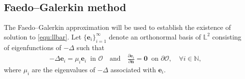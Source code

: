 \documentclass[11pt, reqno]{amsart}
\theoremstyle{definition}
\newtheorem{lemma}[theorem]{Lemma}
\numberwithin{equation}{section}
\newcommand{\bff}{\boldsymbol}
\newcommand{\bb}{\mathbb}
\newcommand{\norm}[2]{\left\|{#1}\right\|_{#2}}
\begin{document}
%


\subsection{Faedo--Galerkin method}\label{subsec:faedo}

The Faedo--Galerkin approximation will be used to establish the existence of solution to \eqref{equ:llbar}.
Let $\{\bff{e}_i\}_{i=1}^\infty$ denote an orthonormal basis of $\bb{L}^2$
consisting of eigenfunctions of $-\Delta$ such that
\begin{align*}
	-\Delta \bff{e}_i =\mu_i \bff{e}_i \ \text{ in $\mathscr{O}$}
	\quad\text{and}\quad
	\frac{\partial \bff{e}_i}{\partial \bff{n}}= \bff{0} \ \text{ on } \partial \mathscr{O},
	\quad \forall i\in \bb{N},
\end{align*}
where $\mu_i$ are the eigenvalues of $-\Delta$ associated with $\bff{e}_i$.
\end{document}
